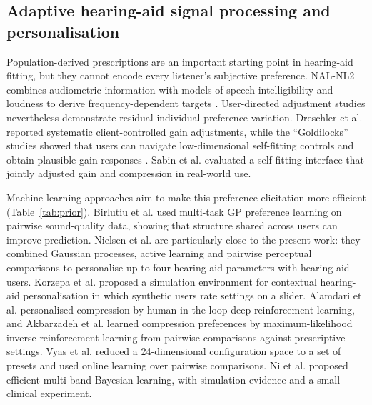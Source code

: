 \documentclass[preprint,12pt]{elsarticle}
\begin{document}
\subsection{Adaptive hearing-aid signal processing and personalisation}

Population-derived prescriptions are an important starting point in hearing-aid fitting, but they cannot encode every listener's subjective preference. NAL-NL2 combines audiometric information with models of speech intelligibility and loudness to derive frequency-dependent targets \cite{keidser2011}. User-directed adjustment studies nevertheless demonstrate residual individual preference variation. Dreschler et al. \cite{dreschler2008} reported systematic client-controlled gain adjustments, while the ``Goldilocks'' studies showed that users can navigate low-dimensional self-fitting controls and obtain plausible gain responses \cite{boothroyd2017,mackersie2019}. Sabin et al. \cite{sabin2020} evaluated a self-fitting interface that jointly adjusted gain and compression in real-world use.

Machine-learning approaches aim to make this preference elicitation more efficient (Table~\ref{tab:prior}). Birlutiu et al. \cite{birlutiu2010} used multi-task GP preference learning on pairwise sound-quality data, showing that structure shared across users can improve prediction. Nielsen et al. \cite{nielsen2015} are particularly close to the present work: they combined Gaussian processes, active learning and pairwise perceptual comparisons to personalise up to four hearing-aid parameters with hearing-aid users. Korzepa et al. \cite{korzepa2020} proposed a simulation environment for contextual hearing-aid personalisation in which synthetic users rate settings on a slider. Alamdari et al. \cite{alamdari2020} personalised compression by human-in-the-loop deep reinforcement learning, and Akbarzadeh et al. \cite{akbarzadeh2022} learned compression preferences by maximum-likelihood inverse reinforcement learning from pairwise comparisons against prescriptive settings. Vyas et al. \cite{vyas2022} reduced a 24-dimensional configuration space to a set of presets and used online learning over pairwise comparisons. Ni et al. \cite{ni2024} proposed efficient multi-band Bayesian learning, with simulation evidence and a small clinical experiment.
\end{document}
